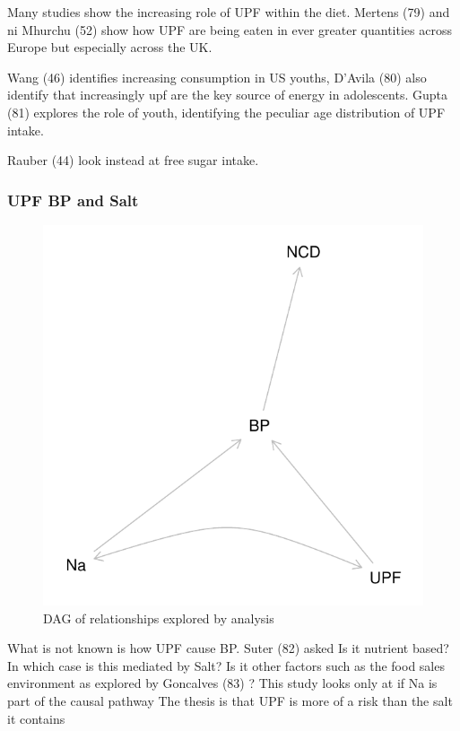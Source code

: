 \documentclass[
]{article}
\begin{document}
Many studies show the increasing role of UPF within the diet. Mertens
(79) and ni Mhurchu (52) show how UPF are being eaten in ever greater
quantities across Europe but especially across the UK.

Wang (46) identifies increasing consumption in US youths, D'Avila (80)
also identify that increasingly upf are the key source of energy in
adolescents. Gupta (81) explores the role of youth, identifying the
peculiar age distribution of UPF intake.

Rauber (44) look instead at free sugar intake.

\hypertarget{upf-bp-and-salt}{%
\subsubsection{UPF BP and Salt}\label{upf-bp-and-salt}}

\begin{figure}
\centering
\includegraphics{nextlevel_files/figure-latex/fig-dagupfbp-1.pdf}
\caption{DAG of relationships explored by analysis}
\end{figure}

What is not known is how UPF cause BP. Suter (82) asked Is it nutrient
based? In which case is this mediated by Salt? Is it other factors such
as the food sales environment as explored by Goncalves (83) ? This study
looks only at if Na is part of the causal pathway The thesis is that UPF
is more of a risk than the salt it contains
\end{document}
